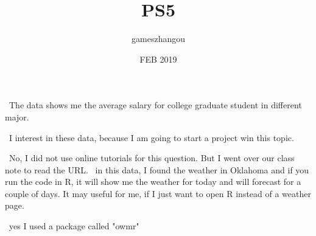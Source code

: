 \documentclass{article}
\title{PS5}
\author{gameszhangou }
\date{ FEB 2019 }
\begin{document}
\
The data shows me the average salary for college graduate student in different major.


\
I interest in these data, because I am going to start a project win this topic.

\
No, I did not use online tutorials for this question. But I went over our class note to read the URL.
\
in this data, I found the weather in Oklahoma and if you run the code in R, it will show me the weather for today and will forecast for a couple of days. It may useful for me, if I just want to open R instead of a weather page. 

\
yes I used a package called "owmr"
\end{document}
